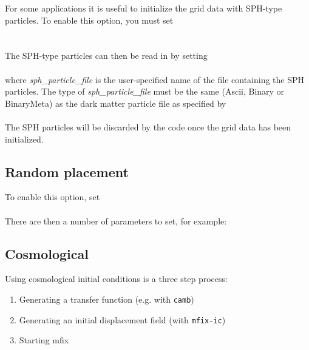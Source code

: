 For some applications it is useful to initialize the grid data with SPH-type
particles.   To enable this option, you must set \\

 \\
 \\

\noindent The SPH-type particles can then be read in by setting \\

 \\

\noindent where {\em sph\_particle\_file} is the user-specified name of the file
containing the SPH particles.  The type of {\em sph\_particle\_file} 
must be the same (Ascii, Binary or BinaryMeta) as the dark matter particle 
file as specified by   \\

 \\

\noindent The SPH particles will be discarded by the code once the grid data has been initialized.

\subsection{Random placement}

To enable this option, set \\

 \\

\noindent There are then a number of parameters to set, for example: \\




\subsection{Cosmological}

Using cosmological initial conditions is a three step process:
\begin{enumerate}
	\item Generating a transfer function (e.g. with \texttt{camb})
	\item Generating an initial displacement field (with \texttt{mfix-ic})
	\item Starting mfix
\end{enumerate}

